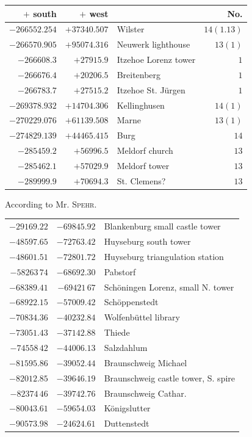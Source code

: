 \clearpage
\begin{center}\begingroup\fontsize{8}{9}\selectfont
\setlength{\tabcolsep}{4pt}
\begin{tabular}{r|r|p{170pt}|r}\hline
\(+\) south&\(+\) west&&No.\\\hline
\(-266552.254\)&\(+37340.507\)&Wilster&\(14(1.13)\)\\
\(-266570.905\)&\(+95074.316\)&Neuwerk lighthouse&\(13(1)\)\\
\(-266608.3\)&\(+27915.9\)&Itzehoe Lorenz tower&\(1\)\\
\(-266676.4\)&\(+20206.5\)&Breitenberg&\(1\)\\
\(-266783.7\)&\(+27515.2\)&Itzehoe St. Jürgen&\(1\)\\
\(-269378.932\)&\(+14704.306\)&Kellinghusen&\(14(1)\)\\
\(-270229.076\)&\(+61139.508\)&Marne&\(13(1)\)\\
\(-274829.139\)&\(+44465.415\)&Burg&\(14\)\\
\(-285459.2\)&\(+56996.5\)&Meldorf church&\(13\)\\
\(-285462.1\)&\(+57029.9\)&Meldorf tower&\(13\)\\
\(-289999.9\)&\(+70694.3\)&St. Clemens?&\(13\)\\
\hline\end{tabular}\endgroup\end{center}
\begin{center}According to Mr. \textsc{Spehr}.\end{center}
\begin{center}\begingroup\fontsize{8}{9}\selectfont
\setlength{\tabcolsep}{4pt}
\begin{tabular}{rrp{190pt}}
\(-29169.22\)&\(-69845.92\)&Blankenburg small castle tower\\
\(-48597.65\)&\(-72763.42\)&Huyseburg south tower\\
\(-48601.51\)&\(-72801.72\)&Huyseburg triangulation station\\
\(-58263\,74\)&\(-68692.30\)&Pabstorf\\
\(-68389.41\)&\(-69421\,67\)&Schöningen Lorenz, small N. tower\\
\(-68922.15\)&\(-57009.42\)&Schöppenstedt\\
\(-70834.36\)&\(-40232.84\)&Wolfenbüttel library\\
\(-73051.43\)&\(-37142.88\)&Thiede\\
\(-74558\,42\)&\(-44006.13\)&Salzdahlum\\
\(-81595.86\)&\(-39052.44\)&Braunschweig Michael\\
\(-82012.85\)&\(-39646.19\)&Braunschweig castle tower, S. spire\\
\(-82374\,46\)&\(-39742.76\)&Braunschweig Cathar.\\
\(-80043.61\)&\(-59654.03\)&Königslutter\\
\(-90573.98\)&\(-24624.61\)&Duttenstedt\\
\end{tabular}\endgroup\end{center}
